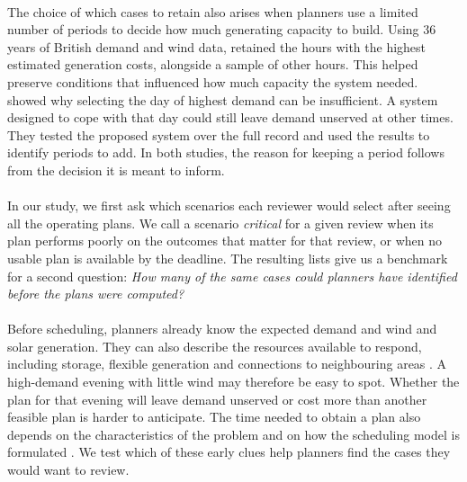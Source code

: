 \documentclass[11pt,a4paper]{article}
\begin{document}
\paragraph{}
The choice of which cases to retain also arises when planners use a limited number of periods to decide how much generating capacity to build. Using 36 years of British demand and wind data, \citet{hilbers2019} retained the hours with the highest estimated generation costs, alongside a sample of other hours. This helped preserve conditions that influenced how much capacity the system needed. \citet{teichgraeber2021} showed why selecting the day of highest demand can be insufficient. A system designed to cope with that day could still leave demand unserved at other times. They tested the proposed system over the full record and used the results to identify periods to add. In both studies, the reason for keeping a period follows from the decision it is meant to inform.

\paragraph{}
In our study, we first ask which scenarios each reviewer would select after seeing all the operating plans. We call a scenario \emph{critical} for a given review when its plan performs poorly on the outcomes that matter for that review, or when no usable plan is available by the deadline. The resulting lists give us a benchmark for a second question: \emph{How many of the same cases could planners have identified before the plans were computed?}

\paragraph{}
Before scheduling, planners already know the expected demand and wind and solar generation. They can also describe the resources available to respond, including storage, flexible generation and connections to neighbouring areas \citep{papaefthymiou2018}. A high-demand evening with little wind may therefore be easy to spot. Whether the plan for that evening will leave demand unserved or cost more than another feasible plan is harder to anticipate. The time needed to obtain a plan also depends on the characteristics of the problem and on how the scheduling model is formulated \citep{smithmiles2012,knueven2020}. We test which of these early clues help planners find the cases they would want to review.
\end{document}
